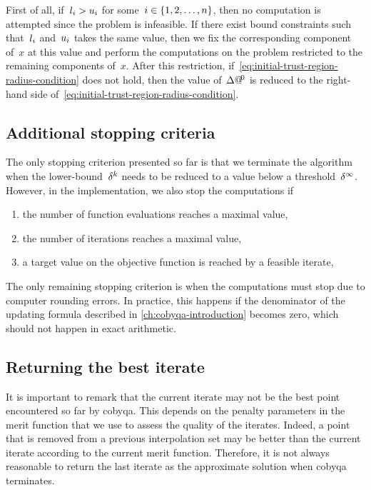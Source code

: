 First of all, if~$l_i > u_i$ for some~$i \in \{1, 2, \dots, n\}$, then no computation is attempted since the problem is infeasible.
If there exist bound constraints such that~$l_i$ and~$u_i$ takes the same value, then we fix the corresponding component of~$x$ at this value and perform the computations on the problem restricted to the remaining components of~$x$.
After this restriction, if~\cref{eq:initial-trust-region-radius-condition} does not hold, then the value of~$\rad[0]$ is reduced to the right-hand side of~\cref{eq:initial-trust-region-radius-condition}.

\subsection{Additional stopping criteria}

The only stopping criterion presented so far is that we terminate the algorithm when the lower-bound~$\radlb[k]$ needs to be reduced to a value below a threshold~$\radlb[\infty]$.
However, in the implementation, we also stop the computations if
\begin{enumerate}
    \item the number of function evaluations reaches a maximal value,
    \item the number of iterations reaches a maximal value,
    \item a target value on the objective function is reached by a feasible iterate,
\end{enumerate}
The only remaining stopping criterion is when the computations must stop due to computer rounding errors.
In practice, this happens if the denominator of the updating formula described in \cref{ch:cobyqa-introduction} becomes zero, which should not happen in exact arithmetic.

\subsection{Returning the best iterate}

It is important to remark that the current iterate may not be the best point encountered so far by \gls{cobyqa}.
This depends on the penalty parameters in the merit function that we use to assess the quality of the iterates.
Indeed, a point that is removed from a previous interpolation set may be better than the current iterate according to the current merit function.
Therefore, it is not always reasonable to return the last iterate as the approximate solution when \gls{cobyqa} terminates.


